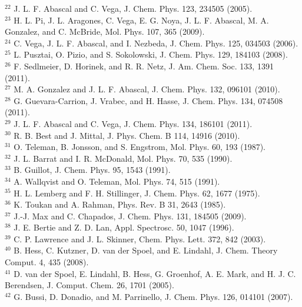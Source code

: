 \documentclass[10pt]{article}
\begin{document}
${ }^{22}$ J. L. F. Abascal and C. Vega, J. Chem. Phys. 123, 234505 (2005).\\
${ }^{23}$ H. L. Pi, J. L. Aragones, C. Vega, E. G. Noya, J. L. F. Abascal, M. A. Gonzalez, and C. McBride, Mol. Phys. 107, 365 (2009).\\
${ }^{24}$ C. Vega, J. L. F. Abascal, and I. Nezbeda, J. Chem. Phys. 125, 034503 (2006).\\
${ }^{25}$ L. Pusztai, O. Pizio, and S. Sokolowski, J. Chem. Phys. 129, 184103 (2008).\\
${ }^{26}$ F. Sedlmeier, D. Horinek, and R. R. Netz, J. Am. Chem. Soc. 133, 1391 (2011).\\
${ }^{27}$ M. A. Gonzalez and J. L. F. Abascal, J. Chem. Phys. 132, 096101 (2010).\\
${ }^{28}$ G. Guevara-Carrion, J. Vrabec, and H. Hasse, J. Chem. Phys. 134, 074508 (2011).\\
${ }^{29}$ J. L. F. Abascal and C. Vega, J. Chem. Phys. 134, 186101 (2011).\\
${ }^{30}$ R. B. Best and J. Mittal, J. Phys. Chem. B 114, 14916 (2010).\\
${ }^{31}$ O. Teleman, B. Jonsson, and S. Engstrom, Mol. Phys. 60, 193 (1987).\\
${ }^{32}$ J. L. Barrat and I. R. McDonald, Mol. Phys. 70, 535 (1990).\\
${ }^{33}$ B. Guillot, J. Chem. Phys. 95, 1543 (1991).\\
${ }^{34}$ A. Wallqvist and O. Teleman, Mol. Phys. 74, 515 (1991).\\
${ }^{35}$ H. L. Lemberg and F. H. Stillinger, J. Chem. Phys. 62, 1677 (1975).\\
${ }^{36}$ K. Toukan and A. Rahman, Phys. Rev. B 31, 2643 (1985).\\
${ }^{37}$ J.-J. Max and C. Chapados, J. Chem. Phys. 131, 184505 (2009).\\
${ }^{38}$ J. E. Bertie and Z. D. Lan, Appl. Spectrosc. 50, 1047 (1996).\\
${ }^{39}$ C. P. Lawrence and J. L. Skinner, Chem. Phys. Lett. 372, 842 (2003).\\
${ }^{40}$ B. Hess, C. Kutzner, D. van der Spoel, and E. Lindahl, J. Chem. Theory Comput. 4, 435 (2008).\\
${ }^{41}$ D. van der Spoel, E. Lindahl, B. Hess, G. Groenhof, A. E. Mark, and H. J. C. Berendsen, J. Comput. Chem. 26, 1701 (2005).\\
${ }^{42}$ G. Bussi, D. Donadio, and M. Parrinello, J. Chem. Phys. 126, 014101 (2007).\\
\end{document}
